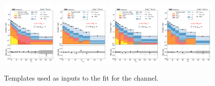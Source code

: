 \begin{figure}[htb!]
    \includegraphics[width=0.24\textwidth]{chapters/Analysis/sectionStatisticalAnalysis/figures/fit/mutau_cat_eq2_eq1}
    \includegraphics[width=0.24\textwidth]{chapters/Analysis/sectionStatisticalAnalysis/figures/fit/mutau_cat_eq2_eq2}
    \includegraphics[width=0.24\textwidth]{chapters/Analysis/sectionStatisticalAnalysis/figures/fit/mutau_cat_gt3_eq1}
    \includegraphics[width=0.24\textwidth]{chapters/Analysis/sectionStatisticalAnalysis/figures/fit/mutau_cat_gt3_gt2}
    \caption{Templates used as inputs to the fit for the \cmt channel.}
    \label{fig:analysis:method:mle:fits_templates_mutau}
\end{figure}
